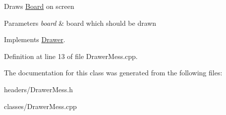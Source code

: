 Draws \hyperlink{classBoard}{Board} on screen 
\begin{DoxyParams}{Parameters}
{\em board} & board which should be drawn \\
\hline
\end{DoxyParams}


Implements \hyperlink{classDrawer_afe75fce45596f02f01514322ebd57c8c}{Drawer}.



Definition at line 13 of file Drawer\+Mess.\+cpp.



The documentation for this class was generated from the following files\+:\begin{DoxyCompactItemize}
\item 
headers/Drawer\+Mess.\+h\item 
classes/Drawer\+Mess.\+cpp\end{DoxyCompactItemize}
